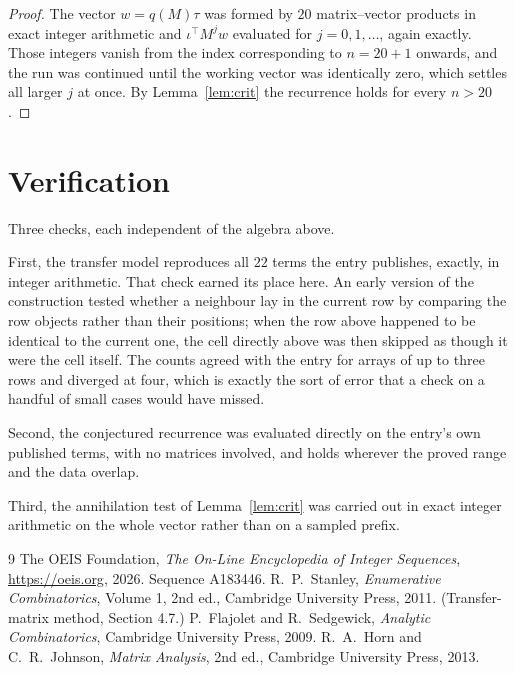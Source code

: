 \documentclass[11pt,a4paper]{article}
\theoremstyle{plain}
\theoremstyle{definition}
\begin{document}
\begin{proof}
The vector $w=q(M)\tau$ was formed by $20$ matrix--vector products in exact integer
arithmetic and $\iota^{\!\top}M^{j}w$ evaluated for $j=0,1,\dots$, again exactly. Those
integers vanish from the index corresponding to $n=20+1$ onwards, and the run was
continued until the working vector was identically zero, which settles all larger $j$ at once.
By Lemma~\ref{lem:crit} the recurrence holds for every $n>20$.
\end{proof}

\section{Verification}

Three checks, each independent of the algebra above.

First, the transfer model reproduces all $22$ terms the entry publishes, exactly, in
integer arithmetic. That check earned its place here. An early version of the construction
tested whether a neighbour lay in the current row by comparing the row objects rather
than their positions; when the row above happened to be identical to the current one, the
cell directly above was then skipped as though it were the cell itself. The counts agreed with
the entry for arrays of up to three rows and diverged at four, which is exactly the sort of
error that a check on a handful of small cases would have missed.

Second, the conjectured recurrence was evaluated directly on the entry's own published terms,
with no matrices involved, and holds wherever the proved range and the data overlap.

Third, the annihilation test of Lemma~\ref{lem:crit} was carried out in exact integer
arithmetic on the whole vector rather than on a sampled prefix.

\begin{thebibliography}{9}
 The OEIS Foundation, \emph{The On-Line Encyclopedia of Integer
Sequences}, \url{https://oeis.org}, 2026. Sequence A183446.
 R.~P.~Stanley, \emph{Enumerative Combinatorics}, Volume 1, 2nd ed.,
Cambridge University Press, 2011. (Transfer-matrix method, Section 4.7.)
 P.~Flajolet and R.~Sedgewick, \emph{Analytic Combinatorics}, Cambridge
University Press, 2009.
 R.~A.~Horn and C.~R.~Johnson, \emph{Matrix Analysis}, 2nd ed., Cambridge
University Press, 2013.
\end{thebibliography}
\end{document}
